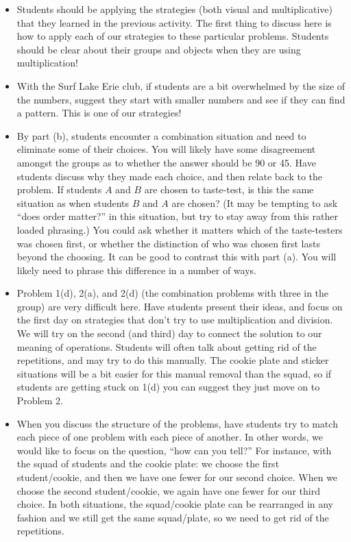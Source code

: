 \documentclass[nooutcomes, noauthor]{ximera}
\begin{document}
\begin{instructorNotes}
\begin{itemize}
	\item Students should be applying the strategies (both visual and multiplicative) that they learned in the previous activity. The first thing to discuss here is how to apply each of our strategies to these particular problems. Students should be clear about their groups and objects when they are using multiplication!
	\item With the Surf Lake Erie club, if students are a bit overwhelmed by the size of the numbers, suggest they start with smaller numbers and see if they can find a pattern. This is one of our strategies!
	\item By part (b), students encounter a combination situation and need to eliminate some of their choices. You will likely have some disagreement amongst the groups as to whether the answer should be 90 or 45. Have students discuss why they made each choice, and then relate back to the problem. If students $A$ and $B$ are chosen to taste-test, is this the same situation as when students $B$ and $A$ are chosen? (It may be tempting to ask ``does order matter?'' in this situation, but try to stay away from this rather loaded phrasing.) You could ask whether it matters which of the taste-testers was chosen first, or whether the distinction of who was chosen first lasts beyond the choosing. It can be good to contrast this with part (a). You will likely need to phrase this difference in a number of ways.
	\item Problem 1(d), 2(a), and 2(d) (the combination problems with three in the group) are very difficult here. Have students present their ideas, and focus on the first day on strategies that don't try to use multiplication and division. We will try on the second (and third) day to connect the solution to our meaning of operations. Students will often talk about getting rid of the repetitions, and may try to do this manually. The cookie plate and sticker situations will be a bit easier for this manual removal than the squad, so if students are getting stuck on 1(d) you can suggest they just move on to Problem 2.
	\item When you discuss the structure of the problems, have students try to match each piece of one problem with each piece of another. In other words, we would like to focus on the question, ``how can you tell?''  For instance, with the squad of students and the cookie plate: we choose the first student/cookie, and then we have one fewer for our second choice. When we choose the second student/cookie, we again have one fewer for our third choice. In both situations, the squad/cookie plate can be rearranged in any fashion and we still get the same squad/plate, so we need to get rid of the repetitions.

\end{itemize}
\end{instructorNotes}
\end{document}
